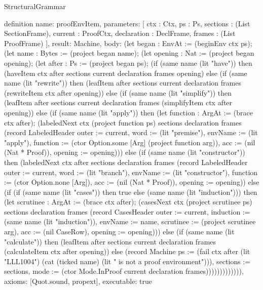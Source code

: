 \begin{lexlean}{StructuralGrammar}
\begin{semanticmodule}
{{definition{
  name: proofEnvItem,
  parameters: [
    ctx : Ctx,
    ps : Ps,
    sections : (List SectionFrame),
    current : ProofCtx,
    declaration : DeclFrame,
    frames : (List ProofFrame)
  ],
  result: Machine,
  body: (let began : EnvAt := (beginEnv ctx ps); (let name : Bytes := (project began name); (let opening : Nat := (project began opening); (let after : Ps := (project began ps); (if (same name (lit "have")) then (haveItem ctx after sections current declaration frames opening) else (if (same name (lit "rewrite")) then (leafItem after sections current declaration frames (rewriteItem ctx after opening)) else (if (same name (lit "simplify")) then (leafItem after sections current declaration frames (simplifyItem ctx after opening)) else (if (same name (lit "apply")) then (let function : ArgAt := (brace ctx after); (labeledNext ctx (project function ps) sections declaration frames (record LabeledHeader {outer := current, word := (lit "premise"), envName := (lit "apply"), function := (ctor Option.some [Arg] (project function arg)), acc := (nil (Nat * Proof)), opening := opening}))) else (if (same name (lit "constructor")) then (labeledNext ctx after sections declaration frames (record LabeledHeader {outer := current, word := (lit "branch"), envName := (lit "constructor"), function := (ctor Option.none [Arg]), acc := (nil (Nat * Proof)), opening := opening})) else (if (if (same name (lit "cases")) then true else (same name (lit "induction"))) then (let scrutinee : ArgAt := (brace ctx after); (casesNext ctx (project scrutinee ps) sections declaration frames (record CasesHeader {outer := current, induction := (same name (lit "induction")), envName := name, scrutinee := (project scrutinee arg), acc := (nil CaseRow), opening := opening}))) else (if (same name (lit "calculate")) then (leafItem after sections current declaration frames (calculateItem ctx after opening)) else (record Machine {ps := (fail ctx after (lit "LLL1004") (cat (ticked name) (lit " is not a proof environment"))), sections := sections, mode := (ctor Mode.InProof current declaration frames)})))))))))))),
  axioms: [Quot.sound, propext],
  executable: true
}

}}
\end{semanticmodule}
\end{lexlean}
